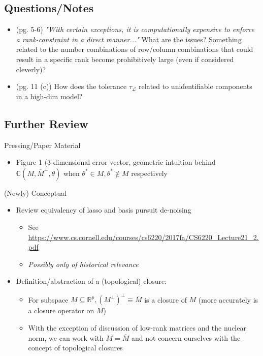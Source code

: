 \documentclass[11pt]{article}
\begin{document}
\subsection*{Questions/Notes}

	\begin{itemize}
        \item (pg. 5-6) {\it "With certain exceptions, it is computationally expensive to enforce a rank-constraint in a direct manner..."} What are the issues? Something related to the number combinations of row/column combinations that could result in a specific rank become prohibitively large (even if considered cleverly)? 
		\item (pg. 11 (c)) How does the tolerance $\tau_\mathcal{L}$ related to unidentifiable components in a high-dim model? 
	\end{itemize}

\subsection*{Further Review}

	Pressing/Paper Material 
	\begin{itemize}	
		\item Figure 1 (3-dimensional error vector, geometric intuition behind $\mathbb{C}(M, \overline{M}^\perp, \theta)$ when $\theta^* \in M, \theta^*\not\in M$ respectively 
	\end{itemize}
	(Newly) Conceptual
	\begin{itemize}
		\item Review equivalency of lasso and basis pursuit de-noising
		\begin{itemize}
			\item See \url{https://www.cs.cornell.edu/courses/cs6220/2017fa/CS6220_Lecture21_2.pdf}
			\item {\it Possibly only of historical relevance}
        \end{itemize}
		\item Definition/abstraction of a (topological) closure:
		\begin{itemize}
			\item For subspace $M \subseteq \mathbb{R}^p, \left(M^\perp \right)^\perp \equiv \overline{M}$ is a closure of $M$ (more accurately is a closure operator on $M$) 
			\item With the exception of discussion of low-rank matrices and the nuclear norm, we can work with $M = \overline{M}$ and not concern ourselves with the concept of topological closures 
        \end{itemize}
	\end{itemize}
	
\end{document}
